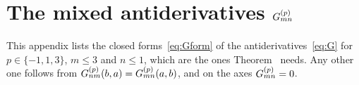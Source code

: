 \section{The mixed antiderivatives \texorpdfstring{$G^{(p)}_{mn}$}{G}}
\label{app:antiderivatives}

This appendix lists the closed forms~\eqref{eq:Gform} of the antiderivatives~\eqref{eq:G} for $p\in\{-1,1,3\}$,
$m\le3$ and $n\le1$, which are the ones Theorem~ needs. Any other one follows from
$G^{(p)}_{nm}(b,a)=G^{(p)}_{mn}(a,b)$, and on the axes $G^{(p)}_{mn}=0$.


